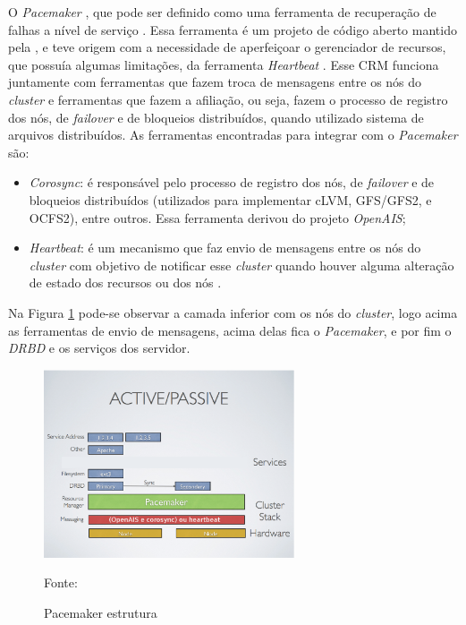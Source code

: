 O \textit{Pacemaker} \cite{pacemaker}, que pode ser definido como uma ferramenta de recuperação de falhas a nível de serviço \cite{perkov2011}. 
Essa ferramenta é um projeto de código aberto mantido pela \cite{clusterlabs}, e teve origem com a necessidade de aperfeiçoar o gerenciador 
de recursos, que possuía algumas limitações, da ferramenta \textit{Heartbeat} \cite{heartbeat}. Esse \ac{CRM} funciona juntamente com ferramentas
que fazem troca de mensagens entre os nós do \textit{cluster} e ferramentas que fazem a afiliação, ou seja, fazem o processo de registro dos
nós, de \textit{failover} e de bloqueios distribuídos, quando utilizado sistema de arquivos distribuídos. 
As ferramentas encontradas para integrar com o \textit{Pacemaker} são:

\begin{itemize}
 \item \textit{Corosync}: é responsável pelo processo de registro dos nós, de \textit{failover} e de bloqueios distribuídos (utilizados para 
 implementar cLVM, GFS/GFS2, e OCFS2), entre outros. Essa ferramenta derivou do projeto \textit{OpenAIS};
 \item \textit{Heartbeat}: é um mecanismo que faz envio de mensagens entre os nós do \textit{cluster} com objetivo de notificar esse 
 \textit{cluster} quando houver alguma alteração de estado dos recursos ou dos nós \cite{clusterlabs}.
\end{itemize}

\newpage
Na Figura \ref{fig:pacemaker_tools} pode-se observar a camada inferior com os nós do \textit{cluster}, logo acima as ferramentas de envio de 
mensagens, acima delas fica o \textit{Pacemaker}, e por fim o \textit{DRBD} e os serviços dos servidor.

\begin{figure}[h!]
 \centering
 \includegraphics[width=280px]{img/pacemaker_tools.eps}
 \caption{Pacemaker estrutura}
 Fonte: \citet{pacemaker}
 \label{fig:pacemaker_tools}
\end{figure}

